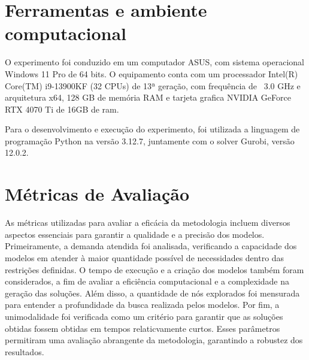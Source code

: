 \section{Ferramentas e ambiente computacional}
O experimento foi conduzido em um computador ASUS, com sistema operacional Windows 11 Pro de 64 bits. O equipamento conta com um processador Intel(R) Core(TM) i9-13900KF (32 CPUs) de 13ª geração, com frequência de ~3.0 GHz e arquitetura x64, 128 GB de memória RAM e tarjeta grafica  NVIDIA GeForce RTX 4070 Ti de 16GB de ram.

Para o desenvolvimento e execução do experimento, foi utilizada a linguagem de programação Python na versão 3.12.7, juntamente com o solver Gurobi, versão 12.0.2.


\section{Métricas de Avaliação}
As métricas utilizadas para avaliar a eficácia da metodologia incluem diversos aspectos essenciais para garantir a qualidade e a precisão dos modelos. Primeiramente, a demanda atendida foi analisada, verificando a capacidade dos modelos em atender à maior quantidade possível de necessidades dentro das restrições definidas. O tempo de execução e a criação dos modelos também foram considerados, a fim de avaliar a eficiência computacional e a complexidade na geração das soluções. Além disso, a quantidade de nós explorados foi mensurada para entender a profundidade da busca realizada pelos modelos. Por fim, a unimodalidade foi verificada como um critério para garantir que as soluções obtidas fossem obtidas em tempos relaticvamente curtos. Esses parâmetros permitiram uma avaliação abrangente da metodologia, garantindo a robustez dos resultados.